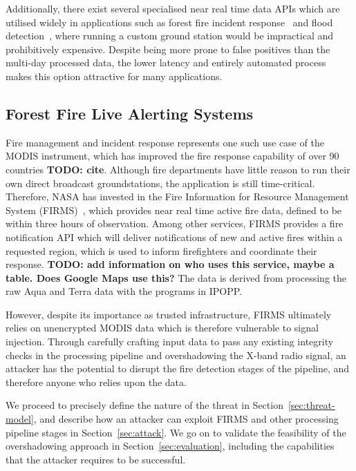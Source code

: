 Additionally, there exist several specialised near real time data APIs which are utilised widely in applications such as forest fire incident response~\cite{nasaFirms} and flood detection~\cite{nasaFlood}, where running a custom ground station would be impractical and prohibitively expensive.
Despite being more prone to false positives than the multi-day processed data, the lower latency and entirely automated process makes this option attractive for many applications.

\subsection{Forest Fire Live Alerting Systems}

Fire management and incident response represents one such use case of the MODIS instrument, which has improved the fire response capability of over 90 countries \textbf{TODO: cite}.
Although fire departments have little reason to run their own direct broadcast groundstations, the application is still time-critical.
Therefore, NASA has invested in the Fire Information for Resource Management System (FIRMS)~\cite{firmsIndex}, which provides near real time active fire data, defined to be within three hours of observation.
Among other services, FIRMS provides a fire notification API which will deliver notifications of new and active fires within a requested region, which is used to inform firefighters and coordinate their response.
\textbf{TODO: add information on who uses this service, maybe a table. Does Google Maps use this?}
The data is derived from processing the raw Aqua and Terra data with the programs in IPOPP.

However, despite its importance as trusted infrastructure, FIRMS ultimately relies on unencrypted MODIS data which is therefore vulnerable to signal injection.
Through carefully crafting input data to pass any existing integrity checks in the processing pipeline and overshadowing the X-band radio signal, an attacker has the potential to disrupt the fire detection stages of the pipeline, and therefore anyone who relies upon the data.

We proceed to precisely define the nature of the threat in Section~\ref{sec:threat-model}, and describe how an attacker can exploit FIRMS and other processing pipeline stages in Section~\ref{sec:attack}.
We go on to validate the feasibility of the overshadowing approach in Section~\ref{sec:evaluation}, including the capabilities that the attacker requires to be successful.


